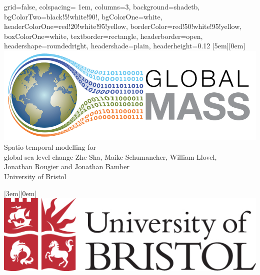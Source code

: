 \documentclass[portrait,a0paper,fontscale=0.29, margin = 8em, final]{baposter}
\begin{document}
\begin{poster}{
 grid=false,
 colspacing= 1em,
 columns=3,
 background=shadetb,
 bgColorTwo=black!5!white!90!,
 bgColorOne=white,
 headerColorOne=red!20!white!95!yellow,
 borderColor=red!50!white!95!yellow,
 boxColorOne=white,
 textborder=rectangle,
 headerborder=open,
 headershape=roundedright,
 headershade=plain,
 headerheight=0.12\textheight}
 {
      \raisebox{0em}[5em][0em]{\includegraphics[scale = 0.7]{GM-logo.png}}
 }
 {\sc Spatio-temporal modelling for \\ \vspace{0.2em} global sea level change}
 {Zhe Sha,  Maike Schumancher,  William Llovel, \\ 
 Jonathan Rougier and Jonathan Bamber
 \\
  \vspace{0.1em}
 {University of Bristol}\\
 \hspace{-2em} 
\noindent{}
}
 {
    \raisebox{0em}[3em][0em]{\includegraphics[scale = 0.21]{UoB-logo-colour.jpg}}

}
\end{poster}
\end{document}
